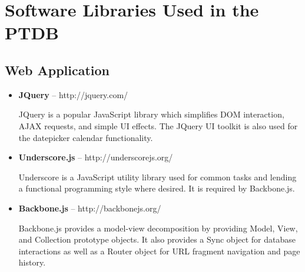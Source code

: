\documentclass[journal]{IEEEtran}
\begin{document}

%

\appendices
\section{Software Libraries Used in the PTDB}
\subsection{Web Application}
\begin{itemize}
  \item \textbf{JQuery} -- http://jquery.com/

   JQuery is a popular JavaScript library which simplifies 
   DOM interaction, AJAX requests, and simple UI effects.
   The JQuery UI toolkit is also used for the datepicker
   calendar functionality.
  \item \textbf{Underscore.js} -- http://underscorejs.org/

   Underscore is a JavaScript utility library used for common
   tasks and lending a functional programming style where
   desired.
   It is required by Backbone.js.
  \item \textbf{Backbone.js} -- http://backbonejs.org/

   Backbone.js provides a model-view decomposition by providing
   Model, View, and Collection prototype objects. It also provides
   a Sync object for database interactions as well as a Router object
   for URL fragment navigation and page history. 
\end{itemize}
\end{document}
